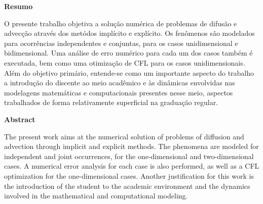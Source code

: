 \begin{huge}
\textbf{Resumo}
\\

\end{huge}

\noindent
	
	O presente trabalho objetiva a solução numérica de problemas de difusão e advecção através dos metódos implícito e explícito. Os fenômenos são modelados para ocorrências independentes e conjuntas, para os casos unidimensional e bidimensional. Uma análise de erro numérico para cada um dos casos também é executada, bem como uma otimização de CFL para os casos unidimensionais. Além do objetivo primário, entende-se como um importante aspecto do trabalho a introdução do discente ao meio acadêmico e às dinâmicas envolvidas nas modelagens matemáticas e computacionais presentes nesse meio, aspectos trabalhados de forma relativamente superficial na graduação regular. 

\newpage

\begin{huge}
	\textbf{Abstract}
	\\
	
\end{huge}

\noindent

The present work aims at the numerical solution of problems of diffusion and advection through implicit and explicit methods. The phenomena are modeled for independent and joint occurrences, for the one-dimensional and two-dimensional cases. A numerical error analysis for each case is also performed, as well as a CFL optimization for the one-dimensional cases. Another justification for this work is the introduction of the student to the academic environment and the dynamics involved in the mathematical and computational modeling.

\newpage